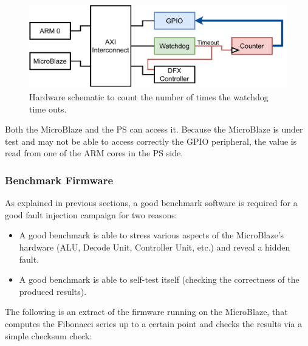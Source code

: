 \begin{figure}[H]
\centering
\includegraphics[width=0.95\linewidth]{images/chapter5/upc.pdf}
\caption{Hardware schematic to count the number of times the watchdog time outs.}
\end{figure}

Both the MicroBlaze and the PS can access it. Because the MicroBlaze is under test and may not be able to access correctly the GPIO peripheral, the value is read from one of the ARM cores in the PS side.\bigskip


\subsubsection{Benchmark Firmware}

As explained in previous sections, a good benchmark software is required for a good fault injection campaign for two reasons:
\begin{itemize}
    \item A good benchmark is able to stress various aspects of the MicroBlaze's hardware (ALU, Decode Unit, Controller Unit, etc.) and reveal a hidden fault.
    \item A good benchmark is able to self-test itself (checking the correctness of the produced results).
\end{itemize}

The following is an extract of the firmware running on the MicroBlaze, that computes the Fibonacci series up to a certain point and checks the results via a simple checksum check:

